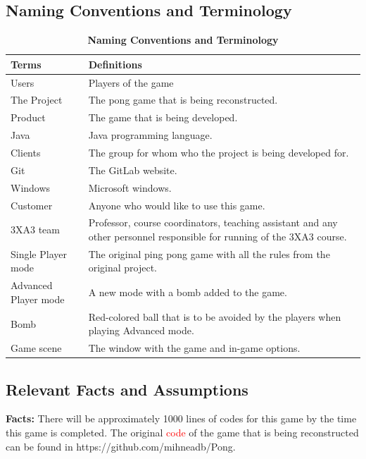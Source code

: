 \documentclass[12pt,letterpaper]{article}
\begin{document}
\subsection{Naming Conventions and Terminology}
\begin{table}[H]
\caption{\bf Naming Conventions and Terminology}
\begin{tabular}{|p{3cm}|p{8cm}|}
\hline
\textbf{Terms}    & \textbf{Definitions}                                                                                                                                                                                                                                                                                                                                                                                                                                \\\hline
Users				&	Players of the game \\\hline
The Project 			&	The pong game that is being reconstructed. \\\hline
Product			&	The game that is being developed. \\\hline
Java				&	Java programming language. \\\hline
Clients			& 	The group for whom who the project is being developed for. \\\hline
Git				&	The GitLab website. \\\hline
Windows       		&	Microsoft windows. \\\hline
Customer			&	Anyone who would like to use this game. \\\hline
3XA3 team			&	Professor, course coordinators, teaching assistant and any other personnel responsible for running of the 3XA3 course. \\\hline
Single Player mode		&	The original ping pong game with all the rules from the original project.	\\\hline
Advanced Player mode	&	A new mode with a bomb added to the game.	\\\hline
Bomb				&	Red-colored ball that is to be avoided by the players when playing Advanced mode.	\\\hline
Game scene			&	The window with the game and in-game options.	\\\hline
\end{tabular}
\end{table}

	\subsection{Relevant Facts and Assumptions}
	\textbf{Facts:} There will be approximately 1000 lines of codes for this game by the time this game is completed. The original \textcolor{red}{code} of the game that is being reconstructed can be found in https://github.com/mihneadb/Pong.\\  
\end{document}
